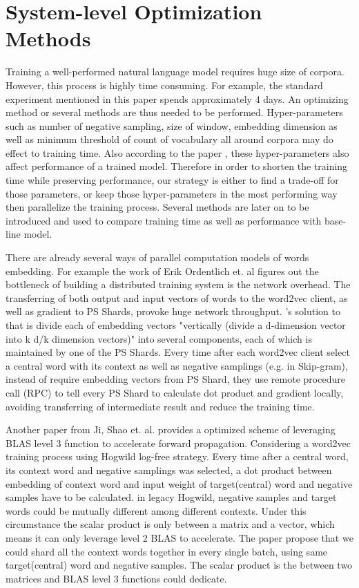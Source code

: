 \section{System-level Optimization Methods}
Training a well-performed natural language model requires huge size of corpora. However, this process is highly time consuming. For example, the standard experiment mentioned in this paper spends approximately 4 days. An optimizing method or several methods are thus needed to be performed. Hyper-parameters such as number of negative sampling, size of window, embedding dimension as well as minimum threshold of count of vocabulary all around corpora may do effect to training time. Also according to the paper \cite{levy2015improving}, these hyper-parameters also affect performance of a trained model. Therefore in order to shorten the training time while preserving performance, our strategy is either to find a trade-off for those parameters, or keep those hyper-parameters in the most performing way then parallelize the training process. Several methods are later on to be introduced and used to compare training time as well as performance with base-line model.

There are already several ways of parallel computation models of words embedding. For example the work of Erik Ordentlich et. al \cite{ordentlich2016network} figures out the bottleneck of building a distributed training system is the network overhead. The transferring of both output and input vectors of words to the word2vec client, as well as gradient to PS Shards, provoke huge network throughput. \citep{ordentlich2016network}'s solution to that is divide each of embedding vectors "vertically (divide a d-dimension vector into k d/k dimension vectors)" into several components, each of which is maintained by one of the PS Shards. Every time after each word2vec client select a central word with its context as well as negative samplings (e.g. in Skip-gram), instead of require embedding vectors from PS Shard, they use remote procedure call (RPC) to tell every PS Shard to calculate dot product and gradient locally, avoiding transferring of intermediate result and reduce the training time.

Another paper from Ji, Shao et. al. \cite{ji2016parallelizing} provides a optimized scheme of leveraging BLAS level 3 function to accelerate forward propagation. Considering a word2vec training process using Hogwild \cite{recht2011hogwild} log-free strategy. Every time after a central word, its context word and negative samplings was selected, a dot product between embedding of context word and input weight of target(central) word and negative samples have to be calculated. in legacy Hogwild, negative samples and target words could be mutually different among different contexts. Under this circumstance the scalar product is only between a matrix and a vector, which means it can only leverage level 2 BLAS to accelerate. The paper propose that we could shard all the context words together in every single batch, using same target(central) word and negative samples. The scalar product is the between two matrices and BLAS level 3 functions could dedicate.

